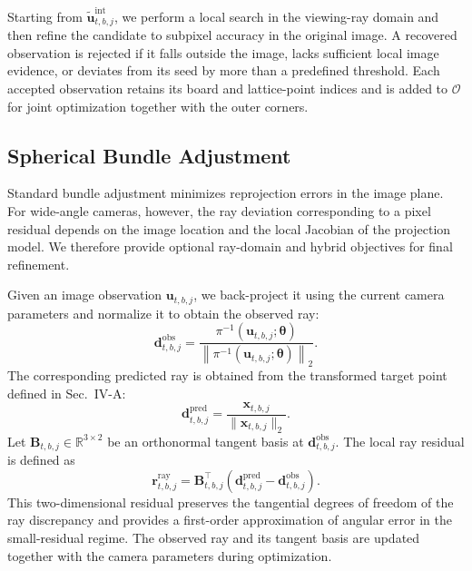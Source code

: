 \documentclass[letterpaper, 10 pt, conference]{ieeeconf}  %
\begin{document}
Starting from $\widetilde{\mathbf{u}}^{\mathrm{int}}_{t,b,j}$, we
perform a local search in the viewing-ray domain and then refine the
candidate to subpixel accuracy in the original image. A recovered
observation is rejected if it falls outside the image, lacks sufficient
local image evidence, or deviates from its seed by more than a predefined
threshold. Each accepted observation retains its board and lattice-point
indices and is added to $\mathcal{O}$ for joint optimization together
with the outer corners.

\subsection{Spherical Bundle Adjustment}

Standard bundle adjustment minimizes reprojection errors in the image
plane. For wide-angle cameras, however, the ray deviation corresponding
to a pixel residual depends on the image location and the local Jacobian
of the projection model. We therefore provide optional ray-domain and
hybrid objectives for final refinement.

Given an image observation $\mathbf{u}_{t,b,j}$, we back-project it
using the current camera parameters and normalize it to obtain the
observed ray:
\begin{equation}
\mathbf{d}^{\mathrm{obs}}_{t,b,j}
=
\frac{
\pi^{-1}(\mathbf{u}_{t,b,j};
\boldsymbol{\theta})
}{
\left\|
\pi^{-1}(\mathbf{u}_{t,b,j};
\boldsymbol{\theta})
\right\|_2
}.
\end{equation}
The corresponding predicted ray is obtained from the transformed target
point defined in Sec.~IV-A:
\begin{equation}
\mathbf{d}^{\mathrm{pred}}_{t,b,j}
=
\frac{\mathbf{x}_{t,b,j}}
{\|\mathbf{x}_{t,b,j}\|_2}.
\end{equation}
Let $\mathbf{B}_{t,b,j}\in\mathbb{R}^{3\times2}$ be an orthonormal
tangent basis at $\mathbf{d}^{\mathrm{obs}}_{t,b,j}$. The local ray
residual is defined as
\begin{equation}
\mathbf{r}^{\mathrm{ray}}_{t,b,j}
=
\mathbf{B}_{t,b,j}^{\top}
\left(
\mathbf{d}^{\mathrm{pred}}_{t,b,j}
-
\mathbf{d}^{\mathrm{obs}}_{t,b,j}
\right).
\end{equation}
This two-dimensional residual preserves the tangential degrees of
freedom of the ray discrepancy and provides a first-order approximation
of angular error in the small-residual regime. The observed ray and its
tangent basis are updated together with the camera parameters during
optimization.
\end{document}
